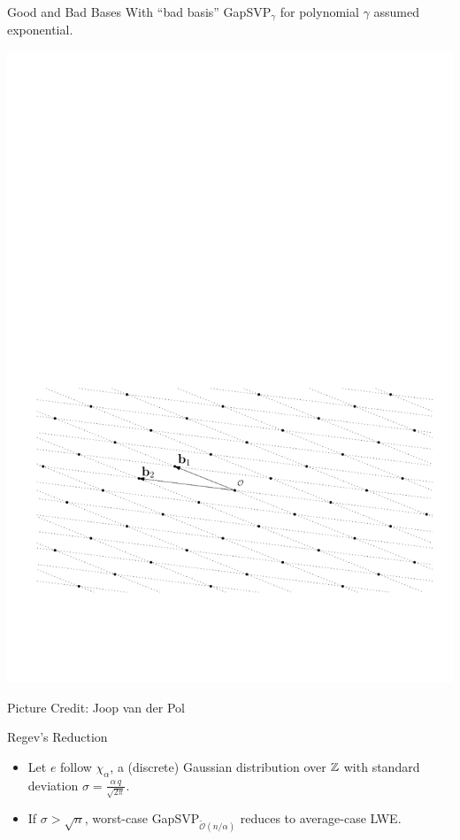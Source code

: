 \documentclass[presentation,smaller]{beamer}
\newcommand{\ZZ}[1][blank]{\ensuremath{\ifthenelse{\equal{#1}{blank}}{\mathbb{Z}}{\mathbb{Z}\left[#1\right]}\xspace}}
\begin{document}
\begin{frame}[label={sec:orgheadline13}]{Good and Bad Bases}
With “bad basis” GapSVP\(_γ\) for polynomial \(γ\) assumed exponential.

\begin{center}
\includegraphics[width=.9\linewidth]{./joop-latt2a.pdf}
\end{center}

\tiny Picture Credit: Joop van der Pol
\end{frame}


\begin{frame}[label={sec:orgheadline14}]{Regev’s Reduction}
\begin{theorem}
\begin{itemize}
\item Let \(e\) follow \(χ_α\), a (discrete) Gaussian distribution over \(\ZZ\) with standard deviation \(σ = \frac{α\, q}{\sqrt{2π}}\).
\item If \(σ >  \sqrt{n}\), worst-case GapSVP\(_{\tilde{\mathcal{O}}(n/α)}\) reduces to average-case LWE.
\end{itemize}
\end{theorem}

\end{frame}
\end{document}
